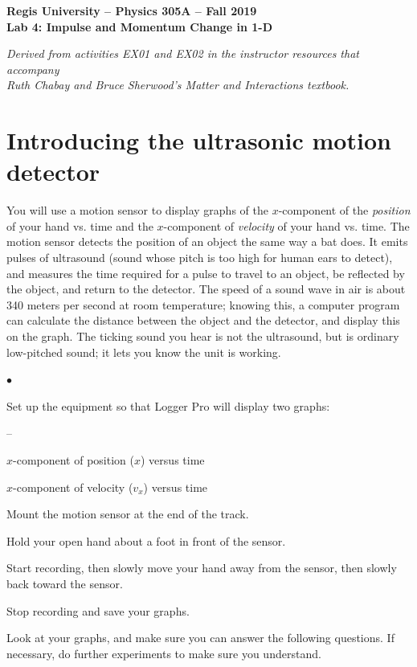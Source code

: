 \documentclass[11pt]{article}
\newcommand{\squishlist}{
   \begin{list}{$\bullet$}
    { \setlength{\itemsep}{0pt}      \setlength{\parsep}{3pt}
      \setlength{\topsep}{3pt}       \setlength{\partopsep}{0pt}
      \setlength{\leftmargin}{1.5em} \setlength{\labelwidth}{1em}
      \setlength{\labelsep}{0.5em} } }
\newcommand{\squishlistB}{
   \begin{list}{--}
    { \setlength{\itemsep}{0pt}      \setlength{\parsep}{3pt}
      \setlength{\topsep}{3pt}       \setlength{\partopsep}{0pt}
      \setlength{\leftmargin}{1.5em} \setlength{\labelwidth}{1em}
      \setlength{\labelsep}{0.5em} } }
\newcommand{\squishend}{
    \end{list}  }
\begin{document}
\begin{center}
\medskip
{\bf{Regis University -- Physics 305A -- Fall 2019}} \\
{\bf{Lab 4: Impulse and Momentum Change in 1-D}} \\
\medskip

{\em\footnotesize {Derived from activities EX01 and EX02 in the instructor resources that
 accompany \\ Ruth Chabay and Bruce Sherwood's {\em Matter and Interactions} 
 textbook.}}
\medskip
\end{center}

\section{Introducing the ultrasonic motion detector}

You will use a motion sensor to display graphs of the $x$-component of the {\em position} of your hand vs. time and the $x$-component of {\em velocity} of your hand vs. time.  The motion sensor detects the position of an object the same way a bat does.
It emits pulses of ultrasound (sound whose pitch is too high for human
ears to detect), and measures the time required for a pulse to travel to an
object, be reflected by the object, and return to the detector. The speed of
a sound wave in air is about 340 meters per second at room temperature; knowing this, a
computer program can calculate the distance between the object and the
detector, and display this on the graph.  The ticking sound you hear is not
the ultrasound, but is ordinary low-pitched sound; it lets you know the unit
is working.

\squishlist
\item Set up the equipment so that Logger Pro will display two graphs:
\squishlistB
\item $x$-component of position ($x$) versus time
\item $x$-component of velocity ($v_x$) versus time
\squishend
\item Mount the motion sensor at the end of the track.
\item Hold your open hand about a foot in front of the sensor.
\item Start recording, then slowly move your hand away from the sensor, then slowly back toward the sensor.
\item Stop recording and save your graphs.\\
\squishend

Look at your graphs, and make sure you can answer the following questions. If necessary, do further experiments to make sure you understand.\\
\end{document}
